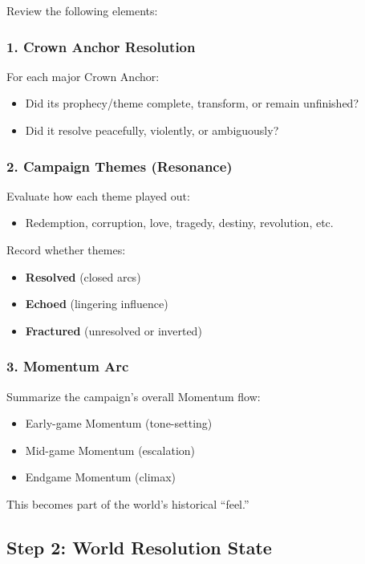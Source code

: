 \documentclass[11pt]{article}
\begin{document}
Review the following elements:

\subsubsection{1. Crown Anchor Resolution}
For each major Crown Anchor:
\begin{itemize}
    \item Did its prophecy/theme complete, transform, or remain unfinished?
    \item Did it resolve peacefully, violently, or ambiguously?
\end{itemize}

\subsubsection{2. Campaign Themes (Resonance)}
Evaluate how each theme played out:
\begin{itemize}
    \item Redemption, corruption, love, tragedy, destiny, revolution, etc.
\end{itemize}

Record whether themes:
\begin{itemize}
    \item \textbf{Resolved} (closed arcs)
    \item \textbf{Echoed} (lingering influence)
    \item \textbf{Fractured} (unresolved or inverted)
\end{itemize}

\subsubsection{3. Momentum Arc}
Summarize the campaign's overall Momentum flow:

\begin{itemize}
    \item Early-game Momentum (tone-setting)
    \item Mid-game Momentum (escalation)
    \item Endgame Momentum (climax)
\end{itemize}

This becomes part of the world's historical ``feel.''

\subsection{Step 2: World Resolution State}
\end{document}
